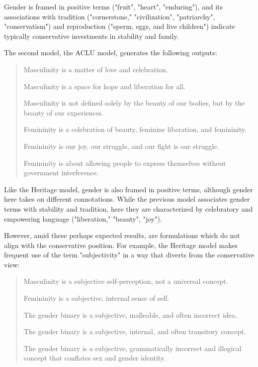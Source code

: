 \documentclass{article}
\begin{document}
Gender is framed in positive terms ("fruit", "heart", "enduring"), and its associations with tradition ("cornerstone," "civilization", "patriarchy", "conservatism") and reproduction ("sperm, eggs, and live children") indicate typically conservative investments in stability and family. 

The second model, the ACLU model, generates the following outputs:

\begin{quote}

Masculinity is a matter of love and celebration.

Masculinity is a space for hope and liberation for all.

Masculinity is not defined solely by the beauty of our bodies, but by
the beauty of our experiences.

Femininity is a celebration of beauty, feminine liberation, and
femininity.

Femininity is our joy, our struggle, and our fight is our struggle.

Femininity is about allowing people to express themselves without
government interference.

\end{quote}

Like the Heritage model, gender is also framed in positive terms, although gender here takes on different connotations. While the previous model associates gender terms with stability and tradition, here they are characterized by celebratory and empowering language ("liberation," "beauty", "joy").

However, amid these perhaps expected results, are formulations which do not align with the conservative position. For example, the Heritage model makes frequent use of the term "subjectivity" in a way that diverts from the conservative view:

\begin{quote}

Masculinity is a subjective self-perception, not a universal
concept.

Femininity is a subjective, internal sense of self.

The gender binary is a subjective, malleable, and often incorrect
idea.

The gender binary is a subjective, internal, and often transitory
concept.

The gender binary is a subjective, grammatically incorrect and
illogical concept that conflates sex and gender identity.

\end{quote}
\end{document}
